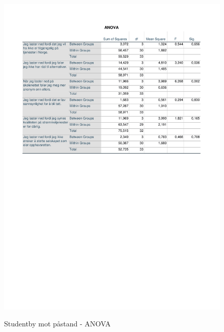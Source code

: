 \begin{figure}[H]
    \centering
    \includegraphics[scale=0.7]{case_1/bilder/ANOVA_studentby-pastand.pdf}
    \label{fig:ANOVA_studentby-påstand}
    \caption{Studentby mot påstand - ANOVA}
\end{figure}


